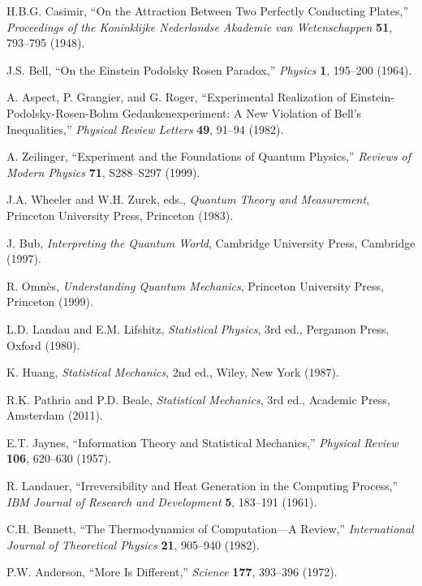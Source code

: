 \documentclass[11pt]{article}
\theoremstyle{plain}
\theoremstyle{definition}
\theoremstyle{remark}
\begin{document}
\begin{thebibliography}{99}
 H.B.G. Casimir, ``On the Attraction Between Two Perfectly Conducting Plates,'' \emph{Proceedings of the Koninklijke Nederlandse Akademie van Wetenschappen} \textbf{51}, 793--795 (1948).

 J.S. Bell, ``On the Einstein Podolsky Rosen Paradox,'' \emph{Physics} \textbf{1}, 195--200 (1964).

 A. Aspect, P. Grangier, and G. Roger, ``Experimental Realization of Einstein-Podolsky-Rosen-Bohm Gedankenexperiment: A New Violation of Bell's Inequalities,'' \emph{Physical Review Letters} \textbf{49}, 91--94 (1982).

 A. Zeilinger, ``Experiment and the Foundations of Quantum Physics,'' \emph{Reviews of Modern Physics} \textbf{71}, S288--S297 (1999).

 J.A. Wheeler and W.H. Zurek, eds., \emph{Quantum Theory and Measurement}, Princeton University Press, Princeton (1983).

 J. Bub, \emph{Interpreting the Quantum World}, Cambridge University Press, Cambridge (1997).

 R. Omnès, \emph{Understanding Quantum Mechanics}, Princeton University Press, Princeton (1999).

 L.D. Landau and E.M. Lifshitz, \emph{Statistical Physics}, 3rd ed., Pergamon Press, Oxford (1980).

 K. Huang, \emph{Statistical Mechanics}, 2nd ed., Wiley, New York (1987).

 R.K. Pathria and P.D. Beale, \emph{Statistical Mechanics}, 3rd ed., Academic Press, Amsterdam (2011).

 E.T. Jaynes, ``Information Theory and Statistical Mechanics,'' \emph{Physical Review} \textbf{106}, 620--630 (1957).

 R. Landauer, ``Irreversibility and Heat Generation in the Computing Process,'' \emph{IBM Journal of Research and Development} \textbf{5}, 183--191 (1961).

 C.H. Bennett, ``The Thermodynamics of Computation—A Review,'' \emph{International Journal of Theoretical Physics} \textbf{21}, 905--940 (1982).

 P.W. Anderson, ``More Is Different,'' \emph{Science} \textbf{177}, 393--396 (1972).


\end{thebibliography}
\end{document}
